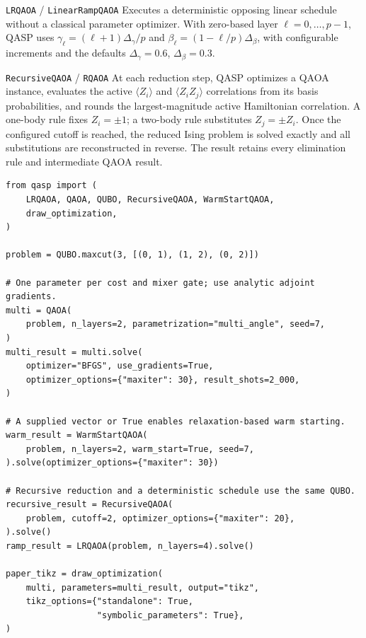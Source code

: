\documentclass[10pt]{article}
\newcommand{\code}[1]{\texttt{#1}}
\begin{document}
\begin{qaspfeature}{\code{LRQAOA} / \code{LinearRampQAOA}}
Executes a deterministic opposing linear schedule without a classical
parameter optimizer.  With zero-based layer $\ell=0,\ldots,p-1$, QASP uses
$\gamma_\ell=(\ell+1)\Delta_\gamma/p$ and
$\beta_\ell=(1-\ell/p)\Delta_\beta$, with configurable increments and the
defaults $\Delta_\gamma=0.6$, $\Delta_\beta=0.3$.
\end{qaspfeature}

\begin{qaspfeature}{\code{RecursiveQAOA} / \code{RQAOA}}
At each reduction step, QASP optimizes a QAOA instance, evaluates the active
$\langle Z_i\rangle$ and $\langle Z_iZ_j\rangle$ correlations from its basis
probabilities, and rounds the largest-magnitude active Hamiltonian correlation.
A one-body rule fixes $Z_i=\pm1$; a two-body rule substitutes
$Z_j=\pm Z_i$.  Once the configured cutoff is reached, the reduced Ising
problem is solved exactly and all substitutions are reconstructed in reverse.
The result retains every elimination rule and intermediate QAOA result.
\end{qaspfeature}

\begin{lstlisting}[caption={Solving one MaxCut QUBO through the QASP QAOA family.},label={lst:optimization-qaoa}]
from qasp import (
    LRQAOA, QAOA, QUBO, RecursiveQAOA, WarmStartQAOA,
    draw_optimization,
)

problem = QUBO.maxcut(3, [(0, 1), (1, 2), (0, 2)])

# One parameter per cost and mixer gate; use analytic adjoint gradients.
multi = QAOA(
    problem, n_layers=2, parametrization="multi_angle", seed=7,
)
multi_result = multi.solve(
    optimizer="BFGS", use_gradients=True,
    optimizer_options={"maxiter": 30}, result_shots=2_000,
)

# A supplied vector or True enables relaxation-based warm starting.
warm_result = WarmStartQAOA(
    problem, n_layers=2, warm_start=True, seed=7,
).solve(optimizer_options={"maxiter": 30})

# Recursive reduction and a deterministic schedule use the same QUBO.
recursive_result = RecursiveQAOA(
    problem, cutoff=2, optimizer_options={"maxiter": 20},
).solve()
ramp_result = LRQAOA(problem, n_layers=4).solve()

paper_tikz = draw_optimization(
    multi, parameters=multi_result, output="tikz",
    tikz_options={"standalone": True,
                  "symbolic_parameters": True},
)
\end{lstlisting}
\end{document}
